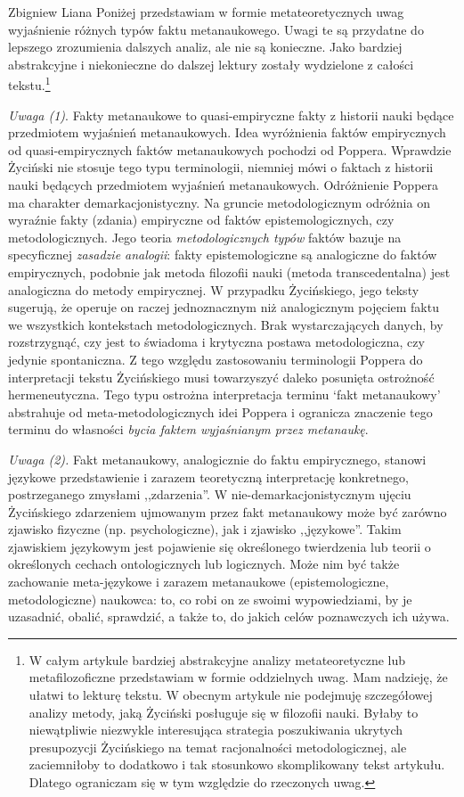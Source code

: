 \begin{artplenv}{Zbigniew Liana}
Poniżej przedstawiam w formie metateoretycznych uwag wyjaśnienie różnych typów faktu metanaukowego. Uwagi te są
przydatne do lepszego zrozumienia dalszych analiz, ale nie są konieczne. Jako bardziej abstrakcyjne i niekonieczne do
dalszej lektury zostały wydzielone z całości tekstu.\footnote{W całym artykule bardziej abstrakcyjne analizy
metateoretyczne lub metafilozoficzne przedstawiam w formie oddzielnych uwag. Mam nadzieję, że ułatwi to lekturę
tekstu. W obecnym artykule nie podejmuję szczegółowej analizy metody, jaką Życiński posługuje się w filozofii nauki. Byłaby to
niewątpliwie niezwykle interesująca strategia poszukiwania ukrytych presupozycji Życińskiego na temat racjonalności
metodologicznej, ale zaciemniłoby to dodatkowo i tak stosunkowo skomplikowany tekst artykułu. Dlatego ograniczam się w tym
względzie do rzeczonych uwag.}

\textit{Uwaga (1)}. Fakty metanaukowe to quasi-empiryczne fakty z historii nauki będące przedmiotem wyjaśnień
metanaukowych. Idea wyróżnienia faktów empirycznych od quasi-empirycznych faktów metanaukowych pochodzi od Poppera.
Wprawdzie Życiński nie stosuje tego typu terminologii, niemniej mówi o faktach z historii nauki będących przedmiotem
wyjaśnień metanaukowych. Odróżnienie Poppera ma charakter demarkacjonistyczny. Na gruncie metodologicznym odróżnia on
wyraźnie fakty (zdania) empiryczne od faktów epistemologicznych, czy metodologicznych. Jego teoria
\textit{metodologicznych typów} faktów bazuje na specyficznej \textit{zasadzie analogii}: fakty epistemologiczne są
analogiczne do faktów empirycznych, podobnie jak metoda filozofii nauki (metoda transcedentalna) jest analogiczna do
metody empirycznej. W przypadku Życińskiego, jego teksty sugerują, że operuje on raczej jednoznacznym niż analogicznym
pojęciem faktu we wszystkich kontekstach metodologicznych. Brak wystarczających danych, by rozstrzygnąć, czy jest to
świadoma i krytyczna postawa metodologiczna, czy jedynie spontaniczna. Z tego względu zastosowaniu terminologii Poppera
do interpretacji tekstu Życińskiego musi towarzyszyć daleko posunięta ostrożność hermeneutyczna. Tego typu ostrożna
interpretacja terminu `fakt metanaukowy' abstrahuje od meta-metodologicznych idei Poppera i ogranicza znaczenie tego
terminu do własności \textit{bycia faktem wyjaśnianym przez metanaukę}.

\textit{Uwaga (2).} Fakt metanaukowy, analogicznie do faktu empirycznego, stanowi językowe przedstawienie i zarazem
teoretyczną interpretację konkretnego, postrzeganego zmysłami ,,zdarzenia''. W nie-demarkacjonistycznym ujęciu
Życińskiego zdarzeniem ujmowanym przez fakt metanaukowy może być zarówno zjawisko fizyczne (np. psychologiczne), jak i zjawisko
,,językowe''. Takim zjawiskiem językowym jest pojawienie się określonego twierdzenia lub teorii o określonych
cechach ontologicznych lub logicznych. Może nim być także zachowanie meta-językowe i zarazem metanaukowe
(epistemologiczne, metodologiczne) naukowca: to, co robi on ze swoimi wypowiedziami, by je uzasadnić, obalić,
sprawdzić, a także to, do jakich celów poznawczych ich używa.


\end{artplenv}
